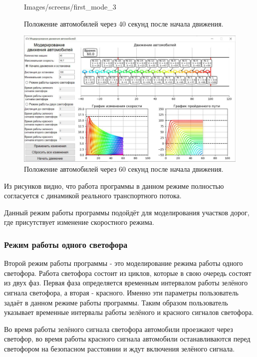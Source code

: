 \documentclass[12pt, a4paper]{extarticle}
\numberwithin{equation}{section}
\numberwithin{figure}{section}
\begin{document}
\begin{figure}[h!]
\begin{center}
\begin{minipage}[h]{0.48\linewidth}
			{Images/screens/first_mode_3}
			\caption{Положение автомобилей через 40 секунд после начала движения.}
			\label{first_mode_3}
		\end{minipage}
			\hfill 
		\begin{minipage}[h]{0.48\linewidth}
			\includegraphics[width=1\linewidth]
			{Images/screens/first_mode_4}
			\caption{Положение автомобилей через 60 секунд после начала движения.}
			\label{first_mode_4}
		\end{minipage}
	\end{center}
\end{figure}

Из рисунков видно, что работа программы в данном режиме полностью согласуется с динамикой реального транспортного потока.

Данный режим работы программы подойдёт для моделирования участков дорог, где присутствует изменение скоростного режима.

\subsubsection{Режим работы одного светофора}

Второй режим работы программы - это моделирование режима работы одного светофора. Работа светофора состоит из циклов, которые в свою очередь состоят из двух фаз. Первая фаза определяется временным интервалом работы зелёного сигнала светофора, а вторая - красного. Именно эти параметры пользователь задаёт в данном режиме работы программы. Таким образом пользователь указывает временные интервалы работы зелёного и красного сигналов светофора. 

Во время работы зелёного сигнала светофора автомобили проезжают через светофор, во время работы красного сигнала автомобили останавливаются перед светофором на безопасном расстоянии и ждут включения зелёного сигнала. 
\end{document}
